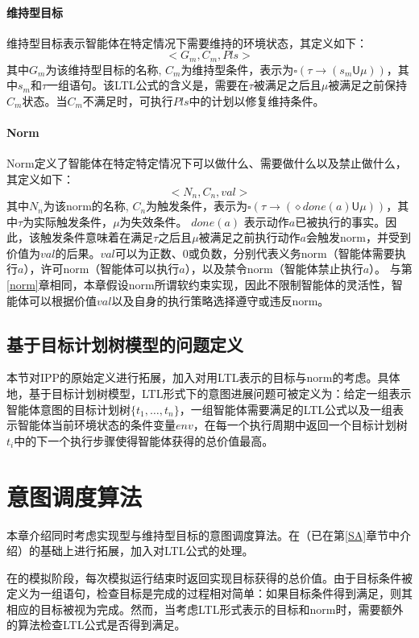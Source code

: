 \paragraph{维持型目标}
维持型目标表示智能体在特定情况下需要维持的环境状态，其定义如下：
$$<G_m, C_m, Pls>$$
其中$G_m$为该维持型目标的名称, $C_m$为维持型条件，表示为$\square (\tau \rightarrow (s_m \mathsf{U} \mu))$，其中$s_m$和$\tau$一组语句。该LTL公式的含义是，需要在$\tau$被满足之后且$\mu$被满足之前保持$C_m$状态。当$C_m$不满足时，可执行$Pls$中的计划以修复维持条件。

\paragraph{Norm}
Norm定义了智能体在特定特定情况下可以做什么、需要做什么以及禁止做什么，其定义如下：
$$<N_n, C_n, val>$$
其中$N_n$为该norm的名称, $C_n$为触发条件，表示为$\square (\tau \rightarrow ( \diamond done(a) \mathsf{U} \mu))$，其中$\tau$为实际触发条件，$\mu$为失效条件。 $done(a)$ 表示动作$a$已被执行的事实。因此，该触发条件意味着在满足$\tau$之后且$\mu$被满足之前执行动作$a$会触发norm，并受到价值为$val$的后果。$val$可以为正数、0或负数，分别代表义务norm（智能体需要执行$a$），许可norm（智能体可以执行$a$），以及禁令norm（智能体禁止执行$a$）。
与第\ref{norm}章相同，本章假设norm所谓软约束实现，因此不限制智能体的灵活性，智能体可以根据价值$val$以及自身的执行策略选择遵守或违反norm。
\subsection{基于目标计划树模型的问题定义}
本节对IPP的原始定义进行拓展，加入对用LTL表示的目标与norm的考虑。具体地，基于目标计划树模型，LTL形式下的意图进展问题可被定义为：给定一组表示智能体意图的目标计划树$\{t_1, \dots, t_n\}$，一组智能体需要满足的LTL公式以及一组表示智能体当前环境状态的条件变量$env$，在每一个执行周期中返回一个目标计划树$t_i$中的下一个执行步骤使得智能体获得的总价值最高。
\section{\SAT 意图调度算法}
本章介绍同时考虑实现型与维持型目标的意图调度算法\SAT 。\SAT 在\SA（已在第\ref{SA}章节中介绍）的基础上进行拓展，加入对LTL公式的处理。

在\SA 的模拟阶段，每次模拟运行结束时返回实现目标获得的总价值。由于目标条件被定义为一组语句，检查目标是完成的过程相对简单：如果目标条件得到满足，则其相应的目标被视为完成。然而，当考虑LTL形式表示的目标和norm时，需要额外的算法检查LTL公式是否得到满足。

